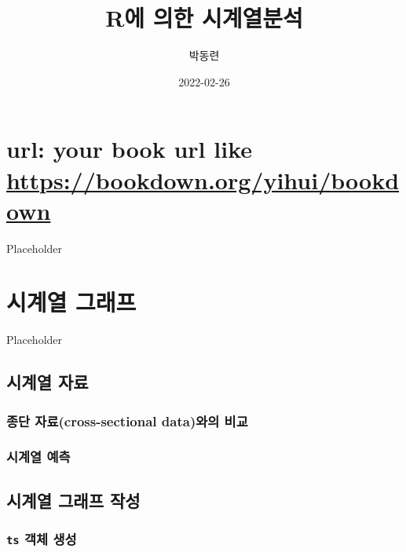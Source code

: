 \documentclass[
]{book}
\title{R에 의한 시계열분석}
\author{박동련}
\date{2022-02-26}
\begin{document}
\maketitle

{
\setcounter{tocdepth}{1}
\tableofcontents
}
\hypertarget{url-your-book-url-like-httpsbookdown.orgyihuibookdown}{%
\chapter{\texorpdfstring{url: your book url like \url{https://bookdown.org/yihui/bookdown}}{url: your book url like https://bookdown.org/yihui/bookdown}}\label{url-your-book-url-like-httpsbookdown.orgyihuibookdown}}

Placeholder

\hypertarget{chapter-ts-plot}{%
\chapter{시계열 그래프}\label{chapter-ts-plot}}

Placeholder

\hypertarget{uxc2dcuxacc4uxc5f4-uxc790uxb8cc}{%
\section{시계열 자료}\label{uxc2dcuxacc4uxc5f4-uxc790uxb8cc}}

\hypertarget{uxc885uxb2e8-uxc790uxb8cccross-sectional-datauxc640uxc758-uxbe44uxad50}{%
\subsection{종단 자료(cross-sectional data)와의 비교}\label{uxc885uxb2e8-uxc790uxb8cccross-sectional-datauxc640uxc758-uxbe44uxad50}}

\hypertarget{uxc2dcuxacc4uxc5f4-uxc608uxce21}{%
\subsection{시계열 예측}\label{uxc2dcuxacc4uxc5f4-uxc608uxce21}}

\hypertarget{uxc2dcuxacc4uxc5f4-uxadf8uxb798uxd504-uxc791uxc131}{%
\section{시계열 그래프 작성}\label{uxc2dcuxacc4uxc5f4-uxadf8uxb798uxd504-uxc791uxc131}}

\hypertarget{ts-uxac1duxccb4-uxc0dduxc131}{%
\subsection{\texorpdfstring{\texttt{ts} 객체 생성}{ts 객체 생성}}\label{ts-uxac1duxccb4-uxc0dduxc131}}
\end{document}
